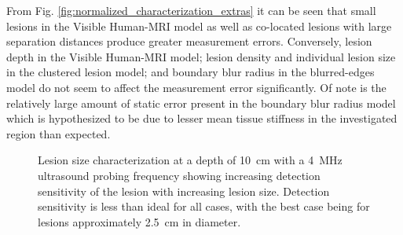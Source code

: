 			From Fig. \ref{fig:normalized_characterization_extras} it can be seen that small lesions in the Visible Human-MRI model as well as co-located lesions with large separation distances produce greater measurement errors. Conversely, lesion depth in the Visible Human-MRI model; lesion density and individual lesion size in the clustered lesion model; and boundary blur radius in the blurred-edges model do not seem to affect the measurement error significantly. Of note is the relatively large amount of static error present in the boundary blur radius model which is hypothesized to be due to lesser mean tissue stiffness in the investigated region than expected.

			\begin{figure}[!htb]
				\centering
				\caption[Quasi-static lesion size characterization]{Lesion size characterization at a depth of \SI{10}{\cm} with a \SI{4}{\MHz} ultrasound probing frequency showing increasing detection sensitivity of the lesion with increasing lesion size. Detection sensitivity is less than ideal for all cases, with the best case being for lesions approximately \SI{2.5}{\cm} in diameter.}
				\label{fig:size_characterization}
			\end{figure}

